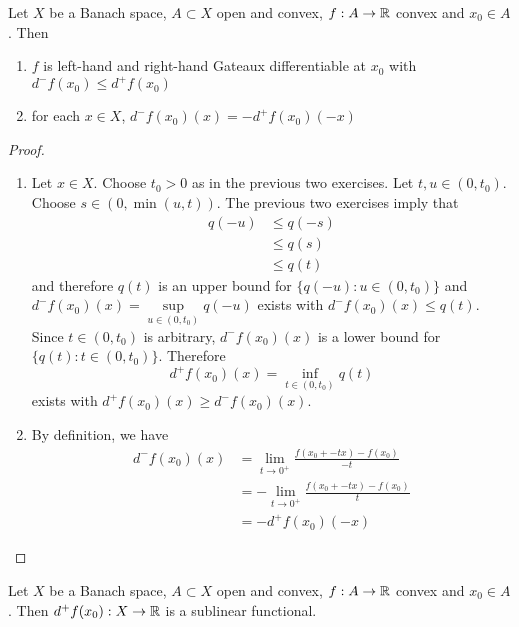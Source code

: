 \documentclass{book}
\begin{document}
	\begin{ex} \lex{}
	Let $X$ be a Banach space, $A \subset X$ open and convex, $f:A \rightarrow \mathbb{R}$ convex and $x_0 \in A$. Then 
	\begin{enumerate}
	\item $f$ is left-hand and right-hand Gateaux differentiable at $x_0$ with $d^-f(x_0) \leq d^+f(x_0)$ 
	\item for each $x \in X$, $d^-f(x_0)(x) = - d^+f(x_0)(-x)$
	\end{enumerate}
	\end{ex}	
	
	\begin{proof}\
	\begin{enumerate}
	\item Let $x \in X$. Choose $t_0 >0$ as in the previous two exercises. Let $t, u \in (0,t_0)$. Choose $s \in (0, \min(u, t))$. The previous two exercises imply that 
	\begin{align*}
	q(-u) 
	& \leq q(-s) \\ 
	&\leq q(s) \\
	&\leq q(t)
	\end{align*} and therefore $q(t)$ is an upper bound for $\{q(-u): u \in (0,t_0)\}$ and $d^-f(x_0)(x) = \sup\limits_{u \in (0,t_0)}q(-u)$ exists with $d^-f(x_0)(x) \leq q(t)$.\\
	Since $t \in (0, t_0)$ is arbitrary, $d^-f(x_0)(x)$ is a lower bound for $\{q(t): t \in (0, t_0)\}$. Therefore $$d^+f(x_0)(x) = \inf_{t \in (0,t_0)}q(t)$$ exists with $d^+f(x_0)(x) \geq d^-f(x_0)(x)$. 
	\item By definition, we have 
	\begin{align*}
	d^-f(x_0)(x)
	&= \lim_{t \rightarrow 0^+} \frac{f(x_0 + -tx) - f(x_0)}{-t} \\
	&= - \lim_{t \rightarrow 0^+} \frac{f(x_0 + -tx) - f(x_0)}{t} \\
	&= - d^+f(x_0)(-x)
	\end{align*}
	\end{enumerate}
	\end{proof}
	
	\begin{ex} \lex{}
	Let $X$ be a Banach space, $A \subset X$ open and convex, $f:A \rightarrow \mathbb{R}$ convex and $x_0 \in A$. Then $d^+f(x_0):X \rightarrow \mathbb{R}$ is a sublinear functional.
	\end{ex}	
	
\end{document}
